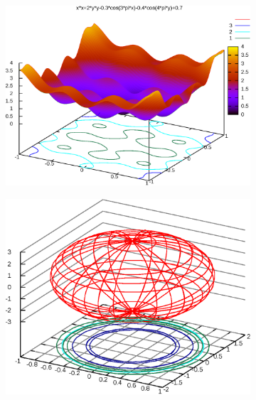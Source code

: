 \documentclass[10pt,a4paper,twocolumn,showkeys,showpacs,aps,groupedaddress,noeprint]{revtex4-1}
\begin{document}
\begin{figure}
\begin{subfigure}[b]{0.485\textwidth}
            \label{fig:2}
\vspace{-12pt}
        \end{subfigure}
        \begin{subfigure}[b]{0.485\textwidth}
            \centering
            \includegraphics[width=\textwidth]{Figs/fig3.eps}
            \label{fig:3}
        \end{subfigure}
        \begin{subfigure}[b]{0.485\textwidth}
            \centering
            \includegraphics[width=\textwidth]{Figs/fig4.eps}
            \label{fig:4}
        \end{subfigure}
\vspace{-10pt}
        \caption[]{\small \lipsum[4]}
\label{fig:plot}
\end{figure} 

\lipsum[4-7]
\end{document}
